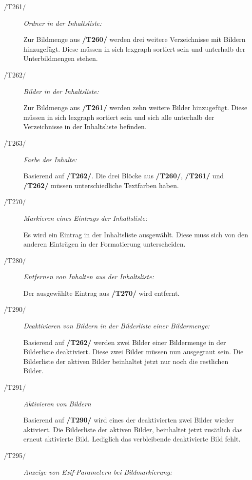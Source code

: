 \begin{description}
			\item[/T261/] \textit{Ordner in der Inhaltsliste:}\par Zur Bildmenge aus \textbf{/T260/} werden drei weitere Verzeichnisse mit Bildern hinzugefügt. Diese müssen in sich \gls{lexgraph} sortiert sein und unterhalb der Unterbildmengen stehen.
			
			\item[/T262/] \textit{Bilder in der Inhaltsliste:}\par Zur Bildmenge aus \textbf{/T261/} werden zehn weitere Bilder hinzugefügt. Diese müssen in sich \gls{lexgraph} sortiert sein und sich alle unterhalb der Verzeichnisse in der Inhaltsliste befinden.
			
			\item[/T263/] \textit{Farbe der Inhalte:}\par Basierend auf \textbf{/T262/}. Die drei Blöcke aus \textbf{/T260/}, \textbf{/T261/} und \textbf{/T262/} müssen unterschiedliche Textfarben haben. 
		
			\item[/T270/] \textit{Markieren eines Eintrags der Inhaltsliste:}\par Es wird ein Eintrag in der Inhaltsliste ausgewählt. Diese muss sich von den anderen Einträgen in der Formatierung unterscheiden.
		
			\item[/T280/] \textit{Entfernen von Inhalten aus der Inhaltsliste:}\par Der ausgewählte Eintrag aus \textbf{/T270/} wird entfernt.
		
			\item[/T290/] \textit{Deaktivieren von Bildern in der Bilderliste einer Bildermenge:}\par Basierend auf \textbf{/T262/} werden zwei Bilder einer Bildermenge in der Bilderliste deaktiviert. Diese zwei Bilder müssen nun ausgegraut sein. Die Bilderliste der aktiven Bilder beinhaltet jetzt nur noch die restlichen Bilder.
			
			\item[/T291/] \textit{Aktivieren von Bildern}\par Basierend auf \textbf{/T290/} wird eines der deaktivierten zwei Bilder wieder aktiviert. Die Bilderliste der aktiven Bilder, beinhaltet jetzt zusätlich das erneut aktivierte Bild. Lediglich das verbleibende deaktivierte Bild fehlt.
			
			\item[/T295/] \textit{Anzeige von Exif-Parametern bei Bildmarkierung:}\par
			
		\end{description}
	
